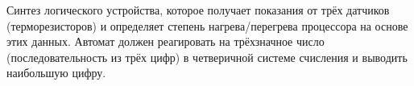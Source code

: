 
Синтез логического устройства,  которое получает показания от трёх 
датчиков (терморезисторов) и определяет степень нагрева/перегрева 
процессора на основе этих данных. Автомат должен реагировать на 
трёхзначное число (последовательность из трёх цифр) в четверичной 
системе счисления и выводить наибольшую цифру.

